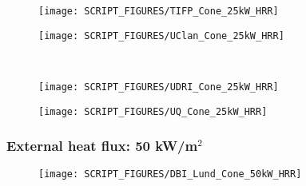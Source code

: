 \begin{landscape}
\begin{minipage}{0.65\textwidth}
\begin{figure}[H]
{\texttt{[image: SCRIPT\_FIGURES/TIFP\_Cone\_25kW\_HRR]}}\\
\end{figure}
\end{minipage}
\begin{minipage}{0.35\textwidth}
\begin{figure}[H]
{\texttt{[image: SCRIPT\_FIGURES/UClan\_Cone\_25kW\_HRR]}}\\
\end{figure}
\end{minipage}\\

\begin{minipage}{0.65\textwidth}
\begin{figure}[H]
{\texttt{[image: SCRIPT\_FIGURES/UDRI\_Cone\_25kW\_HRR]}}\\
\end{figure}
\end{minipage}
\begin{minipage}{0.35\textwidth}
\begin{figure}[H]
{\texttt{[image: SCRIPT\_FIGURES/UQ\_Cone\_25kW\_HRR]}}\\
\end{figure}
\end{minipage}
\vfill


\newpage
\subsubsection{External heat flux: 50 kW/m$^2$}
\begin{minipage}{0.65\textwidth}
\begin{figure}[H]
{\texttt{[image: SCRIPT\_FIGURES/DBI\_Lund\_Cone\_50kW\_HRR]}}\\
\end{figure}
\end{minipage}
\vfill

\newpage

\end{landscape}
